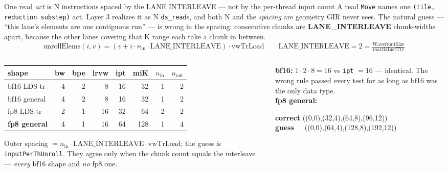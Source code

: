 \documentclass[aspectratio=169,9pt]{beamer}
\newcommand{\tsub}[1]{{\footnotesize\color{gray}#1}}
\newcommand{\key}[1]{\textcolor{acc}{\textbf{#1}}}
\newcommand{\bad}[1]{\textcolor{warn}{\textbf{#1}}}
\newcommand{\good}[1]{\textcolor{ok}{\textbf{#1}}}
\begin{document}
\begin{frame}{One read \emph{act} is N instructions spaced by the LANE INTERLEAVE --- not by the per-thread input count}
\footnotesize
A read \texttt{Move} names one \texttt{(tile, reduction substep)} act. Layer 3 realizes it as N \texttt{ds\_read}s,
and both N and the \emph{spacing} are geometry GIR never sees. The natural guess --- ``this lane's elements are one
contiguous run'' --- is wrong in the spacing: consecutive chunks are \key{LANE\_INTERLEAVE} chunk-widths apart,
because the other lanes covering that K range each take a chunk in between.
\[ \mathrm{unrollElems}(i,v) = (v + i\cdot n_{\mathrm{in}}\cdot \mathrm{LANE\_INTERLEAVE})\cdot \mathrm{vwTrLoad}
\qquad \mathrm{LANE\_INTERLEAVE} = 2 = \tfrac{\mathrm{WavefrontSize}}{\mathrm{matrixInstTO}} \]
\vspace{-3mm}
\begin{columns}[T]
\begin{column}{0.54\textwidth}
\begin{center}\scriptsize
\begin{tabular}{@{}lrrrrrrr@{}}
\toprule
shape & bw & bpe & lrvw & ipt & miK & $n_{\mathrm{in}}$ & $n_{\mathrm{out}}$\\
\midrule
bf16 LDS-tr & 4 & 2 & 8 & 16 & 32 & 1 & 2\\
bf16 general & 4 & 2 & 8 & 16 & 32 & 1 & 2\\
fp8 LDS-tr & 2 & 1 & 16 & 32 & 64 & 2 & 2\\
\bad{fp8 general} & 4 & 1 & 16 & 64 & 128 & 1 & 4\\
\bottomrule
\end{tabular}
\end{center}
\tsub{Outer spacing $= n_{\mathrm{in}}\cdot\mathrm{LANE\_INTERLEAVE}\cdot\mathrm{vwTrLoad}$; the guess is
\texttt{inputPerThUnroll}. They agree only when the chunk count equals the interleave --- \emph{every} bf16 shape
and \emph{no} fp8 one.}
\end{column}
\begin{column}{0.46\textwidth}
\textbf{bf16:} $1\cdot2\cdot8 = 16$ vs \texttt{ipt} $=16$ --- identical. The wrong rule passed every test for as long
as bf16 was the only data type.\\[3pt]
\textbf{fp8 general:}
\begin{center}\ttfamily\scriptsize
\good{correct} ((0,0),(32,4),(64,8),(96,12))\\
\bad{guess\ \ } ((0,0),(64,4),(128,8),(192,12))
\end{center}

\end{column}
\end{columns}
\end{frame}
\end{document}
